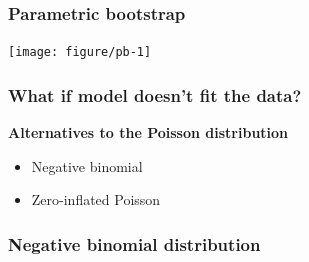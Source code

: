 \documentclass[color=usenames,dvipsnames]{beamer}\usepackage[]{graphicx}\usepackage[]{color}
\begin{document}
\begin{frame}
  \frametitle{Parametric bootstrap}
  \begin{center}
    \texttt{[image: figure/pb-1]}
  \end{center}
\end{frame}




\begin{frame}
  \frametitle{What if model doesn't fit the data?}
  \Large
  {\bf Alternatives to the Poisson distribution}
  \begin{itemize}
    \item Negative binomial
    \item Zero-inflated Poisson
  \end{itemize}
\end{frame}





\begin{frame}
  \frametitle{Negative binomial distribution}



\begin{center}
\end{center}
\end{frame}
\end{document}
